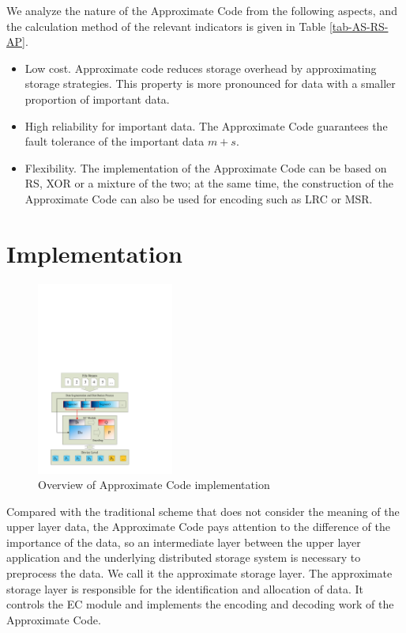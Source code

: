 \documentclass[sigconf]{acmart}
\begin{document}
We analyze the nature of the Approximate Code from the following aspects, and the calculation method of the relevant indicators is given in Table \ref{tab-AS-RS-AP}.
\begin{itemize}
    \item Low cost. Approximate code reduces storage overhead by approximating storage strategies. This property is more pronounced for data with a smaller proportion of important data.
    \item High reliability for important data. The Approximate Code guarantees the fault tolerance of the important data $m+s$.
    \item Flexibility. The implementation of the Approximate Code can be based on RS, XOR or a mixture of the two; at the same time, the construction of the Approximate Code can also be used for encoding such as LRC or MSR.
\end{itemize}


\section{Implementation}\label{Implementation}

\begin{figure}[htb]
\centering
\includegraphics[width=0.4\textwidth]{photo/implementation.pdf}
\caption{Overview of Approximate Code implementation}
\label{fig-implementation}
\end{figure}

Compared with the traditional scheme that does not consider the meaning of the upper layer data, the Approximate Code pays attention to the difference of the importance of the data, so an intermediate layer between the upper layer application and the underlying distributed storage system is necessary to preprocess the data. We call it the approximate storage layer.
The approximate storage layer is responsible for the identification and allocation of data. It controls the EC module and implements the encoding and decoding work of the Approximate Code. 
\end{document}
